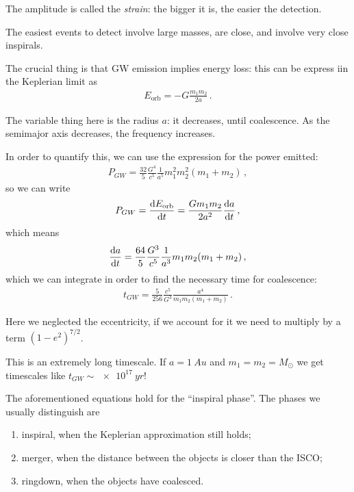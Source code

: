 \documentclass[main.tex]{subfiles}
\begin{document}
The amplitude is called the \emph{strain}: the bigger it is, the easier the detection. 

The easiest events to detect involve large masses, are close, and involve very close inspirals. 

\medskip

The crucial thing is that GW emission implies energy loss: this can be express iin the Keplerian limit as
%
\begin{align}
E _{\text{orb}} = - G \frac{m_1 m_2 }{2a}
\,.
\end{align}

The variable thing here is the radius \(a\): it decreases, until coalescence. 
As the semimajor axis decreases, the frequency increases. 

In order to quantify this, we can use the expression for the power emitted: 
%
\begin{align}
P_{GW} = \frac{32}{5} \frac{G^{4}}{c^{5}}
\frac{1}{a^{5}} m_1^2 m_2^2 (m_1 +m_2 )
\,,
\end{align}
%
so we can write 
%
\begin{align}
P_{GW} = \dv{E _{\text{orb}}}{t} = \frac{Gm_1 m_2 }{2a^2} \dv{a}{t}
\,,
\end{align}
%
which means 
%
\begin{align}
\dv{a}{t} = \frac{64}{5} \frac{G^3}{c^{5}} \frac{1}{a^3} m_1 m_2 (m_1 + m_2 )
\,,
\end{align}
%
which we can integrate in order to find the necessary time for coalescence: 
%
\begin{align}
t_{GW} = \frac{5}{256} \frac{c^{5}}{G^{3}} \frac{a^{4}}{m_1 m_2 (m_1 + m_2 )}
\,.
\end{align}

Here we neglected the eccentricity, if we account for it we need to multiply by a term \((1- e^2)^{7/2}\). 

This is an extremely long timescale. If \(a = \SI{1}{Au}\) and \(m_1 = m_2 = M_{\odot}\) we get timescales like \(t_{GW} \sim \SI{e17}{yr}\)!

The aforementioned equations hold for the ``inspiral phase''. The phases we usually distinguish are 
\begin{enumerate}
  \item inspiral, when the Keplerian approximation still holds;
  \item merger, when the distance between the objects is closer than the ISCO;
  \item ringdown, when the objects have coalesced.
\end{enumerate}
\end{document}
